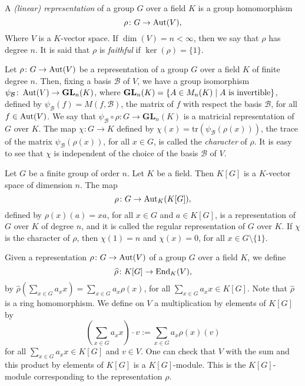 \begin{definition}
A {\em (linear) representation} of a group $G$ over a field $K$ is a group homomorphism 
\[\rho\colon G\rightarrow \operatorname{Aut}(V),\]
Where $V$ is a $K$-vector space. If $\dim(V)=n<\infty$, then we say that $\rho$ has degree $n$. It is said that $\rho$ is {\em faithful} if $\ker(\rho)=\{ 1\}$.
\end{definition}

Let $\rho\colon G\rightarrow\operatorname{Aut}(V)$ be a representation of a group $G$ over a field $K$ of finite degree $n$. 
Then, fixing a basis $\mathcal{B}$ of $V$, we have a group isomorphism $\psi_{\mathcal{B}}\colon \operatorname{Aut}(V)\rightarrow \mathbf{GL}_n(K)$, where $\mathbf{GL}_n(K)=\{ A\in M_n(K)\mid A\mbox{ is invertible}\}$, defined by $\psi_{\mathcal{B}}(f)=M(f,\mathcal{B})$, the matrix
of $f$ with respect the basis $\mathcal{B}$, for all $f\in \operatorname{Aut}(V)$. We say that $\psi_{\mathcal{B}}\circ \rho\colon G\rightarrow \mathbf{GL}_n(K)$ is a matricial representation of $G$ over $K$. The map $\chi\colon G\rightarrow K$ defined by 
$\chi(x)=\mathrm{tr}(\psi_{\mathcal{B}}( \rho(x)))$, the trace of the matrix $\psi_{\mathcal{B}}( \rho(x))$, for all $x\in G$, is called 
the {\em character} of $\rho$. It is easy to see that $\chi$ is independent of the choice of the basis $\mathcal{B}$ of $V$.

\begin{example}
Let $G$ be a finite group of order $n$. Let $K$ be a field. Then $K[G]$ is a $K$-vector space of dimension $n$. The map
\[ \rho\colon G\rightarrow \operatorname{Aut}_K(K[G]),\]
defined by $\rho(x)(a)=xa$, for all $x\in G$ and $a\in K[G]$, is a representation of $G$ over $K$ of degree $n$, and it is called the regular representation of $G$ over $K$. If $\chi$ is the character of $\rho$, then $\chi(1)=n$ and $\chi(x)=0$, for all $x\in G\setminus\{ 1\}$. 
\end{example}

Given a representation $\rho\colon G\rightarrow \operatorname{Aut}(V)$ of a group $G$ over a field $K$, we define 
\[\widehat{\rho}\colon K[G]\rightarrow \operatorname{End}_K(V),\]
by $\widehat{\rho}\left(\sum_{x\in G}a_xx\right)=\sum_{x\in G}a_x\rho(x)$, for all $\sum_{x\in G}a_xx\in K[G]$. Note that
$\widehat{\rho}$ is a ring homomorphism. We define on $V$ a multiplication by elements of $K[G]$ by
\[ \left(\sum_{x\in G}a_xx\right)\cdot v:=\sum_{x\in G}a_x\rho(x)(v)\]
for all $\sum_{x\in G}a_xx\in K[G]$ and $v\in V$. One can check that $V$ with the sum and this product by elements of $K[G]$ is a $K[G]$-module. This is the $K[G]$-module corresponding to the representation $\rho$.

